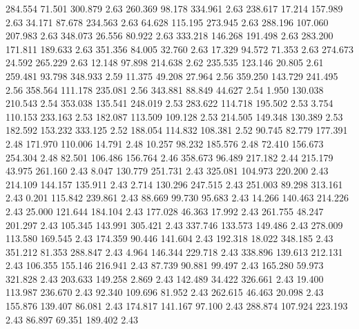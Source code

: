  284.554   71.501  300.879         2.63
 260.369   98.178  334.961         2.63
 238.617   17.214  157.989         2.63
  34.171   87.678  234.563         2.63
  64.628  115.195  273.945         2.63
 288.196  107.060  207.983         2.63
 348.073   26.556   80.922         2.63
 333.218  146.268  191.498         2.63
 283.200  171.811  189.633         2.63
 351.356   84.005   32.760         2.63
  17.329   94.572   71.353         2.63
 274.673   24.592  265.229         2.63
  12.148   97.898  214.638         2.62
 235.535  123.146   20.805         2.61
 259.481   93.798  348.933         2.59
  11.375   49.208   27.964         2.56
 359.250  143.729  241.495         2.56
 358.564  111.178  235.081         2.56
 343.881   88.849   44.627         2.54
   1.950  130.038  210.543         2.54
 353.038  135.541  248.019         2.53
 283.622  114.718  195.502         2.53
   3.754  110.153  233.163         2.53
 182.087  113.509  109.128         2.53
 214.505  149.348  130.389         2.53
 182.592  153.232  333.125         2.52
 188.054  114.832  108.381         2.52
  90.745   82.779  177.391         2.48
 171.970  110.006   14.791         2.48
  10.257   98.232  185.576         2.48
  72.410  156.673  254.304         2.48
  82.501  106.486  156.764         2.46
 358.673   96.489  217.182         2.44
 215.179   43.975  261.160         2.43
   8.047  130.779  251.731         2.43
 325.081  104.973  220.200         2.43
 214.109  144.157  135.911         2.43
   2.714  130.296  247.515         2.43
 251.003   89.298  313.161         2.43
   0.201  115.842  239.861         2.43
  88.669   99.730   95.683         2.43
  14.266  140.463  214.226         2.43
  25.000  121.644  184.104         2.43
 177.028   46.363   17.992         2.43
 261.755   48.247  201.297         2.43
 105.345  143.991  305.421         2.43
 337.746  133.573  149.486         2.43
 278.009  113.580  169.545         2.43
 174.359   90.446  141.604         2.43
 192.318   18.022  348.185         2.43
 351.212   81.353  288.847         2.43
   4.964  146.344  229.718         2.43
 338.896  139.613  212.131         2.43
 106.355  155.146  216.941         2.43
  87.739   90.881   99.497         2.43
 165.280   59.973  321.828         2.43
 203.633  149.258    2.869         2.43
 142.489   34.422  326.661         2.43
  19.400  113.987  236.670         2.43
  92.340  109.696   81.952         2.43
 262.615   46.463   20.098         2.43
 155.876  139.407   86.081         2.43
 174.817  141.167   97.100         2.43
 288.874  107.924  223.193         2.43
  86.897   69.351  189.402         2.43
